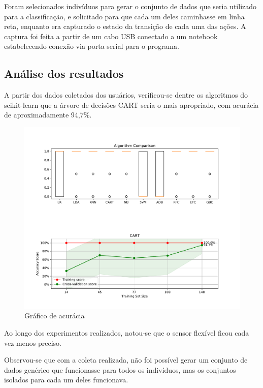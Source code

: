Foram selecionados indivíduos para gerar o conjunto de dados que seria utilizado para a classificação, e solicitado para que cada um deles caminhasse em linha reta, enquanto era capturado o estado da transição de cada uma das ações. A captura foi feita a partir de um cabo USB conectado a um notebook  estabelecendo conexão via porta serial para o programa.

\subsection{Análise dos resultados}

A partir dos dados coletados dos usuários, verificou-se dentre os algoritmos do scikit-learn que a árvore de decisões CART seria o mais apropriado, com acurácia de aproximadamente 94,7\%.
\begin{figure}[ht]
	\caption{\label{fig:result_accuracy_plot}Gráfico de acurácia}
	\begin{center}
	    \includegraphics[width=\textwidth]{resources/result_accuracy_plot}
	\end{center}
\end{figure}

Ao longo dos experimentos realizados, notou-se que o sensor flexível ficou cada vez menos preciso.

Observou-se que com a coleta realizada, não foi possível gerar um conjunto de dados genérico que funcionasse para todos os indivíduos, mas os conjuntos isolados para cada um deles funcionava. 